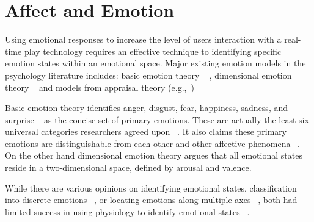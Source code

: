 


\section{Affect and Emotion}

Using emotional responses to increase the level of users interaction with a real-time play technology requires an effective technique to identifying specific emotion states within an emotional space. Major existing emotion models in the psychology literature includes: basic emotion theory ~\cite{ekman1992argument, ekman1992there} , dimensional emotion theory ~\cite{lang1995emotion, russell1980circumplex} and models from appraisal theory (e.g.,~\cite{roseman2001model}) ~\cite{zhang2010service}

Basic emotion theory identifies anger, disgust, fear, happiness, sadness, and surprise ~\cite{peter2006emotion} as the concise set of primary emotions. These are actually the least six universal categories researchers agreed upon ~\cite{zagalo2004story}. It also claims these primary emotions are distinguishable from each other and other affective phenomena ~\cite{dalgleish1999handbook}. On the other hand dimensional emotion theory argues that all emotional states reside in a two-dimensional space, defined by arousal and valence.

While there are various opinions on identifying emotional states, classification into discrete emotions ~\cite{dalgleish1999handbook}, or locating emotions along multiple axes ~\cite{russell1989affect, lang1995emotion}, both had limited success in using physiology to identify emotional states ~\cite{cacioppo2000psychophysiology}.

